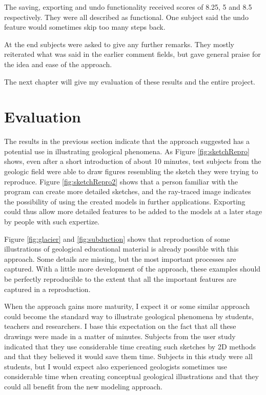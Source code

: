 \documentclass[a4paper,12pt]{report}
\begin{document}
The saving, exporting and undo functionality received scores of 8.25, 5 and 8.5 respectively. They were all described as functional. One subject said the undo feature would sometimes skip too many steps back.

At the end subjects were asked to give any further remarks. They mostly reiterated what was said in the earlier comment fields, but gave general praise for the idea and ease of the approach. 

The next chapter will give my evaluation of these results and the entire project.

\clearpage
\chapter{Evaluation}
\label{sec:eval}
The results in the previous section indicate that the approach suggested has a potential use in illustrating geological phenomena. As Figure \ref{fig:sketchRepro} shows, even after a short introduction of about 10 minutes, test subjects from the geologic field were able to draw figures resembling the sketch they were trying to reproduce. Figure \ref{fig:sketchRepro2} shows that a person familiar with the program can create more detailed sketches, and the ray-traced image indicates the possibility of using the created models in further applications. Exporting could thus allow more detailed features to be added to the models at a later stage by people with such expertize.

Figure \ref{fig:glacier} and \ref{fig:subduction} shows that reproduction of some illustrations of geological educational material is already possible with this approach. Some details are missing, but the most important processes are captured. With a little more development of the approach, these examples should be perfectly reproducible to the extent that all the important features are captured in a reproduction.

When the approach gains more maturity, I expect it or some similar approach could become the standard way to illustrate geological phenomena by students, teachers and researchers. I base this expectation on the fact that all these drawings were made in a matter of minutes. Subjects from the user study indicated that they use considerable time creating such sketches by 2D methods and that they believed it would save them time. Subjects in this study were all students, but I would expect also experienced geologists sometimes use considerable time when creating conceptual geological illustrations and that they  could all benefit from the new modeling approach.
\end{document}
